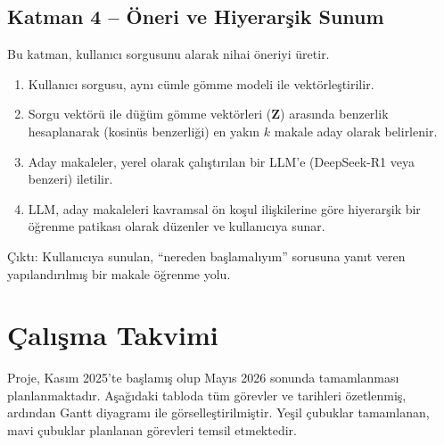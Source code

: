 \documentclass[12pt, a4paper]{article}
\begin{document}
\subsection{Katman 4 -- Öneri ve Hiyerarşik Sunum}

Bu katman, kullanıcı sorgusunu alarak nihai öneriyi üretir.

\begin{enumerate}
    \item Kullanıcı sorgusu, aynı cümle gömme modeli ile vektörleştirilir.
    \item Sorgu vektörü ile düğüm gömme vektörleri ($\mathbf{Z}$) arasında benzerlik hesaplanarak (kosinüs benzerliği) en yakın $k$ makale aday olarak belirlenir.
    \item Aday makaleler, yerel olarak çalıştırılan bir LLM'e (DeepSeek-R1 veya benzeri) iletilir.
    \item LLM, aday makaleleri kavramsal ön koşul ilişkilerine göre hiyerarşik bir öğrenme patikası olarak düzenler ve kullanıcıya sunar.
\end{enumerate}

Çıktı: Kullanıcıya sunulan, ``nereden başlamalıyım'' sorusuna yanıt veren yapılandırılmış bir makale öğrenme yolu.

\section{Çalışma Takvimi}

Proje, Kasım 2025'te başlamış olup Mayıs 2026 sonunda tamamlanması planlanmaktadır. Aşağıdaki tabloda tüm görevler ve tarihleri özetlenmiş, ardından Gantt diyagramı ile görselleştirilmiştir. Yeşil çubuklar tamamlanan, mavi çubuklar planlanan görevleri temsil etmektedir.
\end{document}
